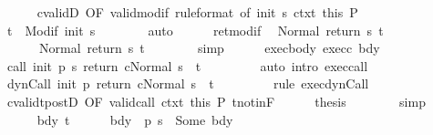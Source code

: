 \begin{isabellebody}
\ \ \ \ \isamarkupfalse%
\ cvalidD\ {\isacharbrackleft}OF\ valid{\isacharunderscore}modif{\isacharprime}\ {\isacharbrackleft}rule{\isacharunderscore}format{\isacharcomma}\ of\ {\isachardoublequoteopen}init\ s{\isachardoublequoteclose}{\isacharbrackright}\ ctxt{\isacharprime}\ this{\isacharbrackright}\ P\isanewline
\ \ \ \ \isamarkupfalse%
\ {\isachardoublequoteopen}t{\isacharprime}\ {\isasymin}\ Modif\ {\isacharparenleft}init\ s{\isacharparenright}{\isachardoublequoteclose}\isanewline
\ \ \ \ \ \ \isamarkupfalse%
\ auto\isanewline
\ \ \ \ \isamarkupfalse%
\ ret{\isacharunderscore}modif\ \isamarkupfalse%
\ {\isachardoublequoteopen}Normal\ {\isacharparenleft}return{\isacharprime}\ s\ t{\isacharprime}{\isacharparenright}\ {\isacharequal}\ \isanewline
\ \ \ \ \ \ Normal\ {\isacharparenleft}return\ s\ t{\isacharprime}{\isacharparenright}{\isachardoublequoteclose}\isanewline
\ \ \ \ \ \ \isamarkupfalse%
\ simp\isanewline
\ \ \ \ \isamarkupfalse%
\ exec{\isacharunderscore}body\ exec{\isacharunderscore}c\ bdy\isanewline
\ \ \ \ \isamarkupfalse%
\ {\isachardoublequoteopen}{\isasymGamma}{\isasymturnstile}{\isasymlangle}call\ init\ {\isacharparenleft}p\ s{\isacharparenright}\ return{\isacharprime}\ c{\isacharcomma}Normal\ s{\isasymrangle}\ {\isasymRightarrow}\ t{\isachardoublequoteclose}\ \isanewline
\ \ \ \ \ \ \isamarkupfalse%
\ {\isacharparenleft}auto\ intro{\isacharcolon}\ exec{\isacharunderscore}call{\isacharparenright}\isanewline
\ \ \ \ \isamarkupfalse%
\ {\isachardoublequoteopen}{\isasymGamma}{\isasymturnstile}{\isasymlangle}dynCall\ init\ p\ return{\isacharprime}\ c{\isacharcomma}Normal\ s{\isasymrangle}\ {\isasymRightarrow}\ t{\isachardoublequoteclose}\ \isanewline
\ \ \ \ \ \ \isamarkupfalse%
\ {\isacharparenleft}rule\ exec{\isacharunderscore}dynCall{\isacharparenright}\isanewline
\ \ \ \ \isamarkupfalse%
\ cvalidt{\isacharunderscore}postD\ {\isacharbrackleft}OF\ valid{\isacharunderscore}call\ ctxt\ this{\isacharbrackright}\ P\ t{\isacharunderscore}notin{\isacharunderscore}F\isanewline
\ \ \ \ \isamarkupfalse%
\ {\isacharquery}thesis\isanewline
\ \ \ \ \ \ \isamarkupfalse%
\ simp\isanewline
\ \ \isamarkupfalse%
\isanewline
\ \ \ \ \isamarkupfalse%
\ bdy\ t{\isacharprime}\isanewline
\ \ \ \ \isamarkupfalse%
\ bdy{\isacharcolon}\ {\isachardoublequoteopen}{\isasymGamma}\ {\isacharparenleft}p\ s{\isacharparenright}\ {\isacharequal}\ Some\ bdy{\isachardoublequoteclose}\isanewline

\end{isabellebody}
